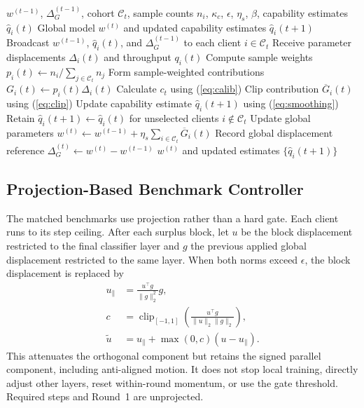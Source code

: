 \documentclass[conference]{IEEEtran}
\begin{document}
\begin{algorithm}[t]
\caption{Legacy Gating: Server Coordination}
\label{alg:server}
\begin{algorithmic}[1]
\REQUIRE $w^{(t-1)}$, $\Delta_G^{(t-1)}$, cohort $\mathcal{C}_t$, sample counts $n_i$, $\kappa_c$, $\epsilon$, $\eta_s$, $\beta$, capability estimates $\widehat q_i(t)$
\ENSURE Global model $w^{(t)}$ and updated capability estimates $\widehat q_i(t+1)$
\STATE Broadcast $w^{(t-1)}$, $\widehat q_i(t)$, and $\Delta_G^{(t-1)}$ to each client $i \in \mathcal{C}_t$
\STATE Receive parameter displacements $\Delta_i(t)$ and throughput $q_i(t)$
\STATE Compute sample weights $p_i(t) \leftarrow n_i / \sum_{j \in \mathcal{C}_t} n_j$
\STATE Form sample-weighted contributions $G_i(t) \leftarrow p_i(t) \Delta_i(t)$
\STATE Calculate $c_t$ using (\ref{eq:calib})
    \STATE Clip contribution $\overline G_i(t)$ using (\ref{eq:clip})
    \STATE Update capability estimate $\widehat q_i(t+1)$ using (\ref{eq:smoothing})
\ENDFOR
\STATE Retain $\widehat q_i(t+1) \leftarrow \widehat q_i(t)$ for unselected clients $i \notin \mathcal{C}_t$
\STATE Update global parameters $w^{(t)} \leftarrow w^{(t-1)} + \eta_s \sum_{i \in \mathcal{C}_t} \overline G_i(t)$
\STATE Record global displacement reference $\Delta_G^{(t)} \leftarrow w^{(t)} - w^{(t-1)}$
\RETURN $w^{(t)}$ and updated estimates $\{\widehat q_i(t+1)\}$
\end{algorithmic}
\end{algorithm}

\subsection{Projection-Based Benchmark Controller}\label{subsec:projection}
The matched benchmarks use projection rather than a hard gate. Each client runs to its step ceiling. After each surplus block, let $u$ be the block displacement restricted to the final classifier layer and $g$ the previous applied global displacement restricted to the same layer. When both norms exceed $\epsilon$, the block displacement is replaced by
\begin{align}
u_\parallel &= \frac{u^\top g}{\|g\|_2^2}g,\nonumber\\
c&=\operatorname{clip}_{[-1,1]}
   \left(\frac{u^\top g}{\|u\|_2\|g\|_2}\right),\nonumber\\
\widetilde u&=u_\parallel+\max(0,c)(u-u_\parallel).
\label{eq:projection}
\end{align}
This attenuates the orthogonal component but retains the signed parallel component, including anti-aligned motion. It does not stop local training, directly adjust other layers, reset within-round momentum, or use the gate threshold. Required steps and Round~1 are unprojected.
\end{document}
